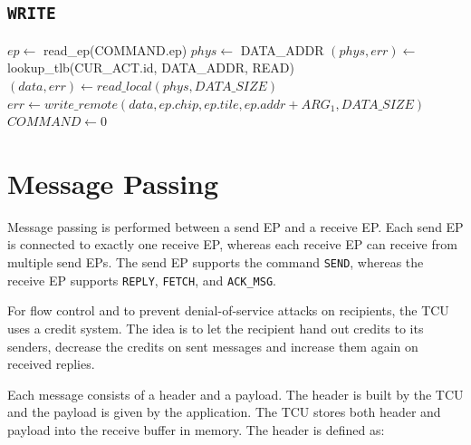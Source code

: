 \subsection{\texttt{WRITE}}

\begin{algorithm}[H]
    $ep \gets$ read\_ep(COMMAND.ep)\;
    \extend{}
    \extend{}
    \BlankLine
    $phys \gets$ DATA\_ADDR\;
    $(phys, err) \gets$ lookup\_tlb(\colorbox{tilemux}{CUR\_ACT.id, }DATA\_ADDR, READ)\;
    \extend{}
    \BlankLine
    $(data, err) \gets read\_local(phys, DATA\_SIZE)$\;
    \extend{}
    $err \gets write\_remote(data, ep.chip, ep.tile, ep.addr + ARG_1, DATA\_SIZE)$\;
    \extend{}
    \BlankLine
    $COMMAND \gets 0$\;
    \caption{The TCU's \texttt{WRITE} command.}
\end{algorithm}

\section{Message Passing}

Message passing is performed between a send EP and a receive EP. Each send EP is connected to
exactly one receive EP, whereas each receive EP can receive from multiple send EPs. The send EP
supports the command \texttt{SEND}, whereas the receive EP supports \texttt{REPLY}, \texttt{FETCH},
and \texttt{ACK\_MSG}.

For flow control and to prevent denial-of-service attacks on recipients, the TCU uses a credit
system. The idea is to let the recipient hand out credits to its senders, decrease the credits on
sent messages and increase them again on received replies.

Each message consists of a header and a payload. The header is built by the TCU and the payload is
given by the application. The TCU stores both header and payload into the receive buffer in memory.
The header is defined as:

